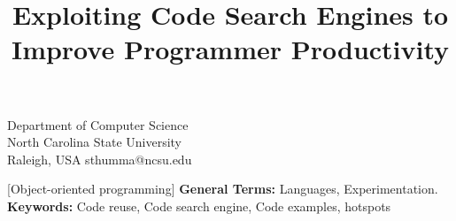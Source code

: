\documentclass{sigplanconf}
\begin{document}


\title{Exploiting Code Search Engines to Improve Programmer Productivity}

           {Department of Computer Science\\North Carolina State University\\Raleigh, USA}
           {sthumma@ncsu.edu}
\maketitle



[Object-oriented programming] 
{\bf General Terms:} Languages, Experimentation.\\
{\bf Keywords:} Code reuse, Code search engine, Code examples, hotspots







\end{document}
